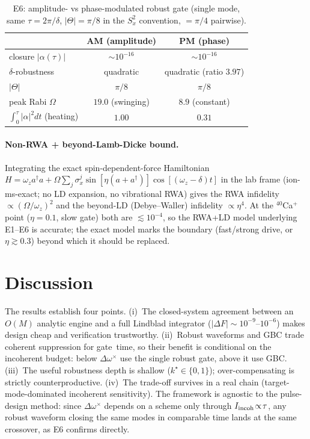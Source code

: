 \documentclass[aps,prapplied,twocolumn,superscriptaddress,floatfix,nofootinbib]{revtex4-2}
\begin{document}
\begin{table}[t]\caption{E6: amplitude- vs phase-modulated robust gate (single mode, same
$\tau=2\pi/\delta$, $|\Theta|=\pi/8$ in the $S_x^2$ convention, $=\pi/4$ pairwise).}\label{tab:e6}
\begin{ruledtabular}\begin{tabular}{lcc}
 & AM (amplitude) & PM (phase) \\ \hline
closure $|\alpha(\tau)|$ & $\sim\!10^{-16}$ & $\sim\!10^{-16}$ \\
$\delta$-robustness & quadratic & quadratic (ratio $3.97$) \\
$|\Theta|$ & $\pi/8$ & $\pi/8$ \\
peak Rabi $\Omega$ & $19.0$ (swinging) & $8.9$ (constant) \\
$\int_0^\tau|\alpha|^2dt$ (heating) & $1.00$ & $0.31$ \\
\end{tabular}\end{ruledtabular}\end{table}

\paragraph{Non-RWA + beyond-Lamb-Dicke bound.} Integrating the exact spin-dependent-force
Hamiltonian $H=\omega_z a^\dagger a+\Omega\sum_j\sigma_x^j\sin[\eta(a{+}a^\dagger)]\cos[(\omega_z{-}\delta)t]$
in the lab frame (\textsf{ion-ms-exact}; no LD expansion, no vibrational RWA) gives the RWA
infidelity $\propto(\Omega/\omega_z)^2$ and the beyond-LD (Debye--Waller) infidelity
$\propto\eta^4$. At the ${}^{40}$Ca$^+$ point ($\eta=0.1$, slow gate) both are
$\lesssim\!10^{-4}$, so the RWA+LD model underlying E1--E6 is accurate; the exact model marks
the boundary (fast/strong drive, or $\eta\gtrsim0.3$) beyond which it should be replaced.

\section{Discussion}\label{sec:disc}
The results establish four points. (i)~The closed-system agreement between an $O(M)$ analytic
engine and a full Lindblad integrator ($|\Delta F|\sim10^{-9}$--$10^{-6}$) makes design cheap
and verification trustworthy. (ii)~Robust waveforms and GBC trade coherent suppression for
gate~time, so their benefit is conditional on the incoherent budget: below $\Delta\omega^\times$
use the single robust gate, above it use GBC. (iii)~The useful robustness depth is shallow
($k^\star\!\in\!\{0,1\}$); over-compensating is strictly counterproductive. (iv)~The trade-off
survives in a real chain (target-mode-dominated incoherent sensitivity). The framework is
agnostic to the pulse-design method: since $\Delta\omega^\times$ depends on a scheme only
through $I_{\rm incoh}\!\propto\!\tau$, any robust waveform closing the same modes in comparable
time lands at the same crossover, as E6 confirms directly.
\end{document}
